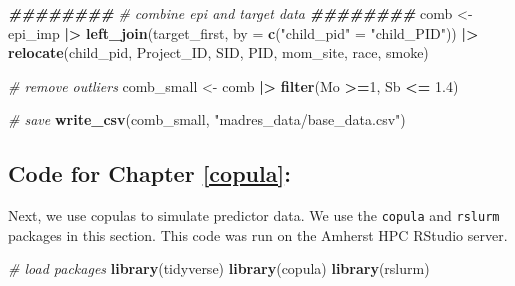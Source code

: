 \documentclass[12pt, twoside]{amherstthesis}
\newenvironment{Shaded}{\begin{snugshade}}{\end{snugshade}}
\newcommand{\AttributeTok}[1]{\textcolor[rgb]{0.13,0.29,0.53}{#1}}
\newcommand{\CommentTok}[1]{\textcolor[rgb]{0.56,0.35,0.01}{\textit{#1}}}
\newcommand{\DecValTok}[1]{\textcolor[rgb]{0.00,0.00,0.81}{#1}}
\newcommand{\DocumentationTok}[1]{\textcolor[rgb]{0.56,0.35,0.01}{\textbf{\textit{#1}}}}
\newcommand{\FloatTok}[1]{\textcolor[rgb]{0.00,0.00,0.81}{#1}}
\newcommand{\FunctionTok}[1]{\textcolor[rgb]{0.13,0.29,0.53}{\textbf{#1}}}
\newcommand{\NormalTok}[1]{#1}
\newcommand{\OtherTok}[1]{\textcolor[rgb]{0.56,0.35,0.01}{#1}}
\newcommand{\SpecialCharTok}[1]{\textcolor[rgb]{0.81,0.36,0.00}{\textbf{#1}}}
\newcommand{\StringTok}[1]{\textcolor[rgb]{0.31,0.60,0.02}{#1}}
\begin{document}
\scriptsize
\begin{Shaded}
\begin{Highlighting}[]
\DocumentationTok{\#\#\#\#\#\#\#\#}
\CommentTok{\# combine epi and target data}
\DocumentationTok{\#\#\#\#\#\#\#\#}
\NormalTok{comb }\OtherTok{\textless{}{-}}\NormalTok{ epi\_imp }\SpecialCharTok{|\textgreater{}} 
  \FunctionTok{left\_join}\NormalTok{(target\_first, }\AttributeTok{by =} \FunctionTok{c}\NormalTok{(}\StringTok{"child\_pid"} \OtherTok{=} \StringTok{"child\_PID"}\NormalTok{)) }\SpecialCharTok{|\textgreater{}} 
  \FunctionTok{relocate}\NormalTok{(child\_pid, Project\_ID, SID, PID, mom\_site, race, smoke) }

\CommentTok{\# remove outliers}
\NormalTok{comb\_small }\OtherTok{\textless{}{-}}\NormalTok{ comb }\SpecialCharTok{|\textgreater{}} 
  \FunctionTok{filter}\NormalTok{(Mo }\SpecialCharTok{\textgreater{}=}\DecValTok{1}\NormalTok{, Sb }\SpecialCharTok{\textless{}=} \FloatTok{1.4}\NormalTok{)}

\CommentTok{\# save}
\FunctionTok{write\_csv}\NormalTok{(comb\_small, }\StringTok{"madres\_data/base\_data.csv"}\NormalTok{)}
\end{Highlighting}
\end{Shaded}
\normalsize

\hypertarget{code-for-chapter-refcopula}{%
\subsection{Code for Chapter \ref{copula}:}\label{code-for-chapter-refcopula}}

Next, we use copulas to simulate predictor data. We use the \texttt{copula} and \texttt{rslurm} packages in this section. This code was run on the Amherst HPC RStudio server.

\scriptsize
\begin{Shaded}
\begin{Highlighting}[]
\CommentTok{\# load packages}
\FunctionTok{library}\NormalTok{(tidyverse)}
\FunctionTok{library}\NormalTok{(copula)}
\FunctionTok{library}\NormalTok{(rslurm)}
\end{Highlighting}
\end{Shaded}
\normalsize
\end{document}
